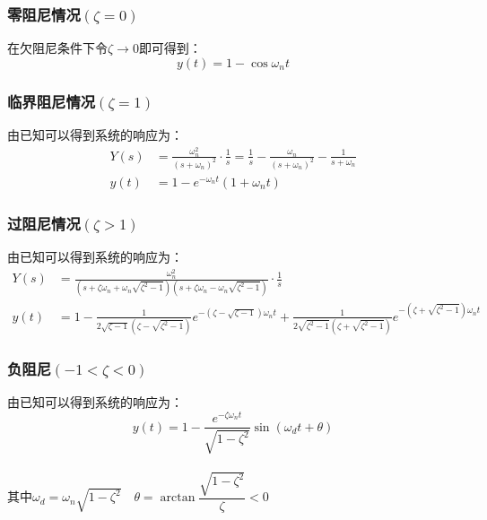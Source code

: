 \subsubsection{零阻尼情况$(\zeta=0)$}
在欠阻尼条件下令$\zeta \rightarrow 0$即可得到：
\begin{equation*}
    y(t) = 1- \cos \omega_n t
\end{equation*}

\subsubsection{临界阻尼情况$(\zeta = 1)$}
由已知可以得到系统的响应为：
\begin{equation*}
    \begin{split}
        Y(s) &= \frac{\omega_n^2}{(s+\omega_n)^2}\cdot \frac{1}{s} = \frac{1}{s}-\frac{\omega_n}{(s+\omega_n)^2}-\frac{1}{s+\omega_n}\\
        y(t) &= 1-e^{-\omega_n t}(1+\omega_n t)
    \end{split}
\end{equation*}

\subsubsection{过阻尼情况$(\zeta>1)$}
由已知可以得到系统的响应为：
\begin{equation*}
    \begin{split}
        Y(s) &= \frac{\omega_n^2}{(s+\zeta\omega_n + \omega_n\sqrt{\zeta^2 - 1})(s+\zeta\omega_n - \omega_n\sqrt{\zeta^2 - 1})} \cdot \frac{1}{s} \\
        y(t) &= 1- \frac{1}{2\sqrt{\zeta - 1}(\zeta - \sqrt{\zeta^2 -1})} e^{-(\zeta - \sqrt{\zeta - 1})\omega_n t} + \frac{1}{2\sqrt{\zeta^2 - 1}(\zeta + \sqrt{\zeta ^2 -1})} e^{-(\zeta + \sqrt{\zeta^2 - 1})\omega_n t}
    \end{split}
\end{equation*}

\subsubsection{负阻尼$(-1<\zeta<0)$}
由已知可以得到系统的响应为：
\begin{equation*}
    y(t) = 1 - \frac{e^{-\zeta \omega_n t}}{\sqrt{1-\zeta^2}}\sin (\omega_d t +\theta)
\end{equation*}\\
其中$\omega_d = \omega_n \sqrt{1-\zeta^2} \quad \theta = \arctan \dfrac{\sqrt{1-\zeta^2}}{\zeta}<0$ \\


